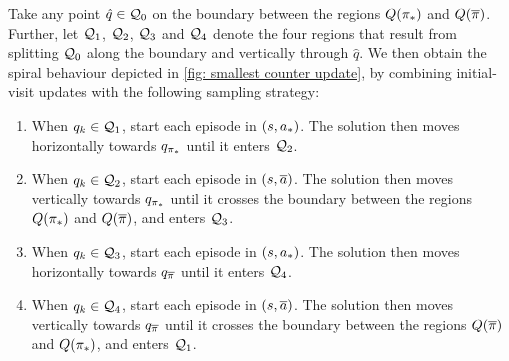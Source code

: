 Take any point $\hat{q} \in \mathcal{Q}_0$ on the boundary between the regions $Q({{\pi}_*})$ and $Q({\overline{\pi}})$.
Further, let $\mathcal{Q}_1$, $\mathcal{Q}_2$, $\mathcal{Q}_3$ and $\mathcal{Q}_4$ denote the four regions that result from splitting $\mathcal{Q}_0$ along the boundary and vertically through $\hat{q}$.
We then obtain the spiral behaviour depicted in \autoref{fig: smallest counter update}, by combining initial-visit updates with the following sampling strategy:
\begin{enumerate}

    \item \label{enum: existing update distrib}
    When $q_{k} \in \mathcal{Q}_1$, start each episode in $(s, {a}_*)$.
    The solution then moves horizontally towards $q_{{\pi}_*}$ until it enters $\mathcal{Q}_2$.
    
    \item 
    When $q_{k} \in \mathcal{Q}_2$, start each episode in $(s, \overline{a})$. 
    The solution then moves vertically towards $q_{{\pi}_*}$ until it crosses the boundary between the regions $Q({{\pi}_*})$ and $Q({\overline{\pi}})$,
    and enters $\mathcal{Q}_3$.

    \item
    When $q_{k} \in \mathcal{Q}_3$, start each episode in $(s, {a}_*)$. 
    The solution then moves horizontally towards $q_{\overline{\pi}}$ until it enters $\mathcal{Q}_4$.

    \item
    When $q_{k} \in \mathcal{Q}_4$, start each episode in $(s, \overline{a})$. 
    The solution then moves vertically towards $q_{\overline{\pi}}$ until it crosses the boundary between the regions $Q({\overline{\pi}})$ and $Q({{\pi}_*})$,
    and enters $\mathcal{Q}_1$.

\end{enumerate}

